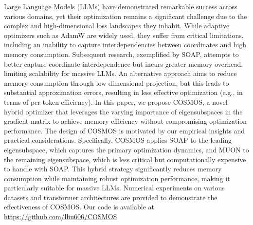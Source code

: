 Large Language Models (LLMs) have demonstrated remarkable success across various domains, yet their optimization remains a significant challenge due to the complex and high-dimensional loss landscapes they inhabit. While adaptive optimizers such as AdamW are widely used, they suffer from critical limitations, including an inability to capture interdependencies between coordinates and high memory consumption. Subsequent research, exemplified by SOAP, attempts to better capture coordinate interdependence but incurs greater memory overhead, limiting scalability for massive LLMs. An alternative approach aims to reduce memory consumption through low-dimensional projection, but this leads to substantial approximation errors, resulting in less effective optimization (e.g., in terms of per-token efficiency). In this paper, we propose COSMOS, a novel hybrid optimizer that leverages the varying importance of eigensubspaces in the gradient matrix to achieve memory efficiency without compromising optimization performance. The design of COSMOS is motivated by our empirical insights and practical considerations. Specifically, COSMOS applies SOAP to the leading eigensubspace, which captures the primary optimization dynamics, and MUON to the remaining eigensubspace, which is less critical but computationally expensive to handle with SOAP. This hybrid strategy significantly reduces memory consumption while maintaining robust optimization performance, making it particularly suitable for massive LLMs. Numerical experiments on various datasets and transformer architectures are provided to demonstrate the effectiveness of COSMOS. Our code is available at \url{https://github.com/lliu606/COSMOS}.